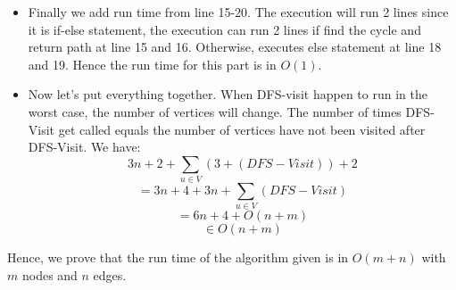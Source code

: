 \documentclass{cpsc413Solutions}
\begin{document}
\begin{problemlist}
\begin{problem}
\begin{answer}
\begin{enumerate}
\begin{itemize}
        \item Finally we add run time from line 15-20. The execution will run 2 lines since it is if-else statement, the execution can run 2 lines if find the cycle and return path at line 15 and 16. Otherwise, executes else statement at line 18 and 19. Hence the run time for this part is in ${O}(1)$.
        
        \item Now let's put everything together. When DFS-visit happen to run in the worst case, the number of vertices will change. The number of times DFS-Visit get called equals the number of vertices have not been visited after DFS-Visit. We have:
        $$ 3n + 2 + \sum_{u \in V} (3 + (DFS-Visit)) + 2$$
        $$= 3n + 4 + 3n + \sum_{u \in V} (DFS-Visit)$$
        $$= 6n + 4 + {O}(n+m)$$
        $$\in {O}(n+m)$$        
    \end{itemize}
\end{enumerate}

Hence, we prove that the run time of the algorithm given is in ${O}(m+n)$ with $m$ nodes and $n$ edges.

\end{answer}
\end{problem}

\end{problemlist}
\end{document}
